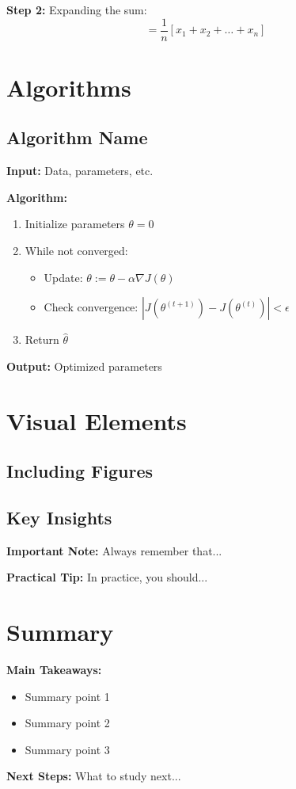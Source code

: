 \documentclass{article}
\begin{document}
\textbf{Step 2:} Expanding the sum:
\[
= \frac{1}{n}[x_1 + x_2 + \ldots + x_n]
\]

\section{Algorithms}

\subsection{Algorithm Name}
\textbf{Input:} Data, parameters, etc.

\textbf{Algorithm:}
\begin{enumerate}
    \item Initialize parameters $\theta = 0$
    \item While not converged:
    \begin{itemize}
        \item Update: $\theta := \theta - \alpha \nabla J(\theta)$
        \item Check convergence: $|J(\theta^{(t+1)}) - J(\theta^{(t)})| < \epsilon$
    \end{itemize}
    \item Return $\hat{\theta}$
\end{enumerate}

\textbf{Output:} Optimized parameters

\section{Visual Elements}

\subsection{Including Figures}

\subsection{Key Insights}
\textbf{Important Note:} Always remember that...

\textbf{Practical Tip:} In practice, you should...

\section{Summary}

\textbf{Main Takeaways:}
\begin{itemize}
    \item Summary point 1
    \item Summary point 2  
    \item Summary point 3
\end{itemize}

\textbf{Next Steps:} What to study next...
\end{document}
